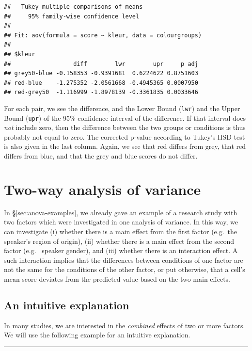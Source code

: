 \documentclass[
]{book}
\begin{document}
\begin{verbatim}
##   Tukey multiple comparisons of means
##     95% family-wise confidence level
## 
## Fit: aov(formula = score ~ kleur, data = colourgroups)
## 
## $kleur
##                  diff        lwr        upr     p adj
## grey50-blue -0.158353 -0.9391681  0.6224622 0.8751603
## red-blue    -1.275352 -2.0561668 -0.4945365 0.0007950
## red-grey50  -1.116999 -1.8978139 -0.3361835 0.0033646
\end{verbatim}

For each pair, we see the difference, and the Lower Bound (\texttt{lwr}) and
the Upper Bound (\texttt{upr}) of the 95\% confidence interval
of the difference. If that interval does \emph{not} include zero, then
the difference between the two groups or conditions is thus probably not
equal to zero. The corrected p-value according to
Tukey's HSD test is also given in the last column.
Again, we see that red differs from grey, that red differs from
blue, and that the grey and blue scores do not differ.

\section{Two-way analysis of variance}\label{two-way-analysis-of-variance}

In §\ref{sec:anova-examples}, we already gave an example
of a research study with two factors which were investigated in one analysis
of variance. In this way, we can investigate (i) whether there is a
main effect from the first factor (e.g.~the speaker's region of origin),
(ii) whether there is a main effect from the second factor (e.g.~
speaker gender), and (iii) whether there is an interaction effect.
A such interaction implies that the differences between conditions of
one factor are not the same
for the conditions of the other factor, or put otherwise, that a cell's mean
score deviates from the predicted value based on the two main effects.

\subsection{An intuitive explanation}\label{an-intuitive-explanation}

In many studies, we are interested in the \emph{combined} effects
of two or more factors. We will use the following example for an intuitive explanation.

\begin{center}\rule{0.5\linewidth}{0.5pt}\end{center}
\end{document}
